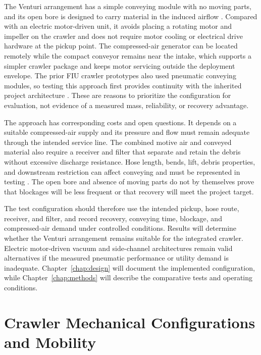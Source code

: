 The Venturi arrangement has a simple conveying module with no moving parts, and its open bore is designed to carry material in the induced airflow \citep{exairLineVacCatalog}. Compared with an electric motor-driven unit, it avoids placing a rotating motor and impeller on the crawler and does not require motor cooling or electrical drive hardware at the pickup point. The compressed-air generator can be located remotely while the compact conveyor remains near the intake, which supports a simpler crawler package and keeps motor servicing outside the deployment envelope. The prior FIU crawler prototypes also used pneumatic conveying modules, so testing this approach first provides continuity with the inherited project architecture \citep{chaviano2025Crawler,verde2025Crawler}. These are reasons to prioritize the configuration for evaluation, not evidence of a measured mass, reliability, or recovery advantage.

The approach has corresponding costs and open questions. It depends on a suitable compressed-air supply and its pressure and flow must remain adequate through the intended service line. The combined motive air and conveyed material also require a receiver and filter that separate and retain the debris without excessive discharge resistance. Hose length, bends, lift, debris properties, and downstream restriction can affect conveying and must be represented in testing \citep{exairLineVacFAQ,evans2013LineVacBackPressure}. The open bore and absence of moving parts do not by themselves prove that blockages will be less frequent or that recovery will meet the project target.

The test configuration should therefore use the intended pickup, hose route, receiver, and filter, and record recovery, conveying time, blockage, and compressed-air demand under controlled conditions. Results will determine whether the Venturi arrangement remains suitable for the integrated crawler. Electric motor-driven vacuum and side-channel architectures remain valid alternatives if the measured pneumatic performance or utility demand is inadequate. Chapter~\ref{chap:design} will document the implemented configuration, while Chapter~\ref{chap:methods} will describe the comparative tests and operating conditions.
\par
\endgroup

\section{Crawler Mechanical Configurations and Mobility}
\label{sec:crawler-mechanical-configurations}
\begingroup
\setlength{\emergencystretch}{2em}

